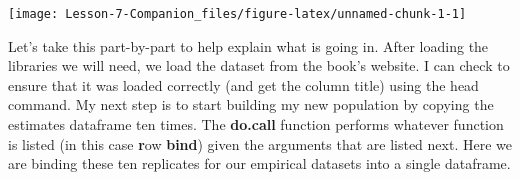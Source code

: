 \documentclass[
]{article}
\newenvironment{Shaded}{\begin{snugshade}}{\end{snugshade}}
\newcommand{\DataTypeTok}[1]{\textcolor[rgb]{0.13,0.29,0.53}{#1}}
\newcommand{\DecValTok}[1]{\textcolor[rgb]{0.00,0.00,0.81}{#1}}
\newcommand{\KeywordTok}[1]{\textcolor[rgb]{0.13,0.29,0.53}{\textbf{#1}}}
\newcommand{\NormalTok}[1]{#1}
\newcommand{\OperatorTok}[1]{\textcolor[rgb]{0.81,0.36,0.00}{\textbf{#1}}}
\newcommand{\OtherTok}[1]{\textcolor[rgb]{0.56,0.35,0.01}{#1}}
\newcommand{\StringTok}[1]{\textcolor[rgb]{0.31,0.60,0.02}{#1}}
\begin{document}
\begin{Shaded}
\end{Shaded}

\begin{center}\texttt{[image: Lesson-7-Companion\_files/figure-latex/unnamed-chunk-1-1]} \end{center}

Let's take this part-by-part to help explain what is going in. After
loading the libraries we will need, we load the dataset from the book's
website. I can check to ensure that it was loaded correctly (and get the
column title) using the head command. My next step is to start building
my new population by copying the estimates dataframe ten times. The
\textbf{do.call} function performs whatever function is listed (in this
case \textbf{r}ow \textbf{bind}) given the arguments that are listed
next. Here we are binding these ten replicates for our empirical
datasets into a single dataframe.
\end{document}
